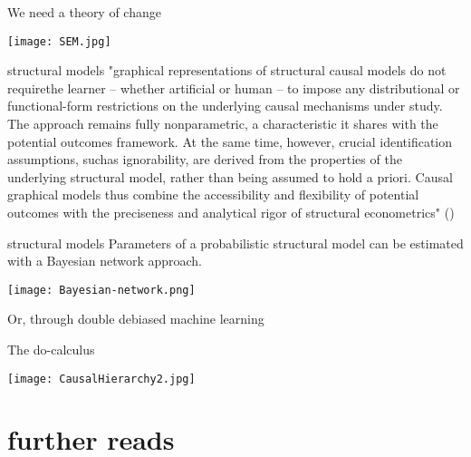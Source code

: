 \documentclass[aspectratio=169]{beamer}
\begin{document}
		\begin{frame}{We need a theory of change}
			\begin{center}
					\texttt{[image: SEM.jpg]}
			\end{center}
		\end{frame}

		\begin{frame}{structural models}
			"graphical representations of structural causal models do not requirethe learner – whether artificial or human – to impose any distributional or functional-form restrictions on the underlying causal mechanisms under study.  The approach remains fully nonparametric, a characteristic it shares with the potential outcomes framework.  At the same time,  however,  crucial identification assumptions,  suchas ignorability, are derived from the properties of the underlying structural model, rather than being assumed to hold a priori.  Causal graphical models thus combine  the  accessibility  and  flexibility  of  potential  outcomes  with  the  preciseness and  analytical  rigor  of  structural  econometrics" (\cite{Hünermund2021})
		\end{frame}

		\begin{frame}{structural models}
			Parameters of a probabilistic structural model can be estimated with a Bayesian network approach.
			\begin{center}
				\texttt{[image: Bayesian-network.png]}
			\end{center}
			Or, through double debiased machine learning \cite{Chernozhukov2018,Jung2021}
		\end{frame}

		\begin{frame}{The do-calculus}
			\begin{center}
				\texttt{[image: CausalHierarchy2.jpg]}
			\end{center}
		\end{frame}

\section{further reads}
\end{document}

